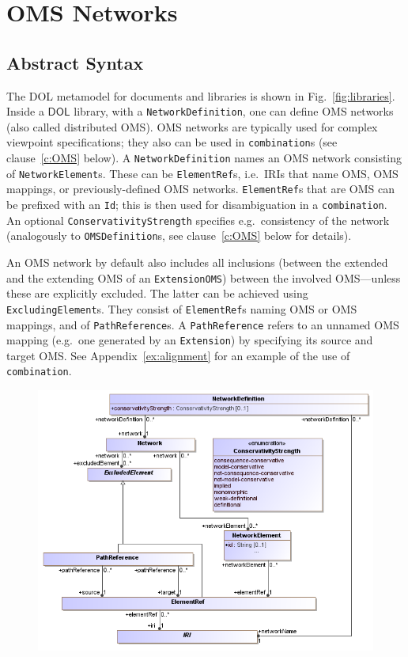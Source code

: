 \documentclass[10pt,fleqn,final]{scrreprt}
\newcommand*{\syntax}[1]{\texttt{#1}}
\newcommand*{\DOL}{\ensuremath{\mathsf{DOL}}\xspace}
\newcommand{\sclause}[1]{\section{#1}}
\newcommand{\ssclause}[1]{\subsection{#1}}
\newenvironment{definitions}[0]{\medskip }{}
\begin{document}
\begin{definitions}


\sclause{OMS Networks}\label{c:networks}
\ssclause{Abstract Syntax}

The DOL metamodel for documents and libraries is shown in Fig.~\ref{fig:libraries}.
Inside a \DOL library, with a \syntax{NetworkDefinition}, one can
define OMS networks (also called distributed OMS). OMS networks are
typically used for complex viewpoint specifications; they also can be
used in \syntax{combination}s (see clause~\ref{c:OMS} below). A
\syntax{NetworkDefinition} names an OMS network consisting of
\syntax{NetworkElement}s. These can be \syntax{ElementRef}s,
i.e.\ IRIs that name OMS, OMS mappings, or previously-defined OMS
networks. \syntax{ElementRef}s that are OMS can be prefixed with an
\syntax{Id}; this is then used for disambiguation in a
\syntax{combination}.  An optional \syntax{ConservativityStrength}
specifies e.g.\ consistency of the network (analogously to
\syntax{OMSDefinition}s, see clause~\ref{c:OMS} below for details).


An OMS network by default also includes all inclusions (between
the extended and the extending OMS of an \syntax{ExtensionOMS})
between the involved OMS---unless these are explicitly excluded.
The latter can be achieved using \syntax{ExcludingElement}s.
They consist of \syntax{ElementRef}s naming OMS or OMS mappings,
and of \syntax{PathReference}s. A \syntax{PathReference} refers
to an unnamed OMS mapping (e.g.\ one generated by an \syntax{Extension}) 
by specifying its source and target OMS. See Appendix~\ref{ex:alignment} for an example of the use of \syntax{combination}.

\medskip
\begin{figure}
  \centering
    \includegraphics[scale=0.47]{mof/networks.png}
  \caption{}
  \label{fig:networks}
\end{figure}



\end{definitions}
\end{document}
